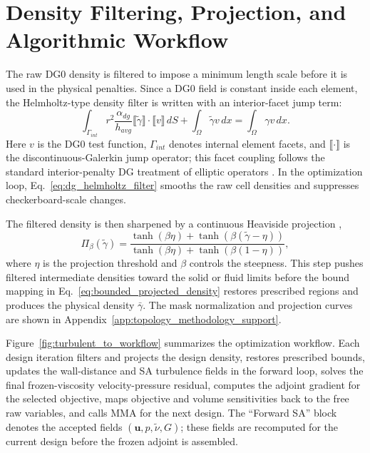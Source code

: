 \section{Density Filtering, Projection, and Algorithmic Workflow}
\label{sec:algorithmic_workflow}
The raw DG0 density is filtered to impose a minimum length scale before it is used in the physical penalties. Since a DG0 field is constant inside each element, the Helmholtz-type density filter \cite{Bourdin2001,Lazarov2011} is written with an interior-facet jump term:
\begin{equation}
	\int_{\Gamma_{int}}
	r^2
	\frac{\alpha_{dg}}{h_{avg}}
	\llbracket \tilde{\gamma} \rrbracket
	\cdot
	\llbracket v \rrbracket
	\,dS
	+
	\int_{\Omega}\tilde{\gamma}v\,dx
	=
	\int_{\Omega}\gamma v\,dx .
	\label{eq:dg_helmholtz_filter}
\end{equation}
Here $v$ is the DG0 test function, $\Gamma_{int}$ denotes internal element facets, and $\llbracket\cdot\rrbracket$ is the discontinuous-Galerkin jump operator; this facet coupling follows the standard interior-penalty DG treatment of elliptic operators \cite{Arnold2002}. In the optimization loop, Eq.~\ref{eq:dg_helmholtz_filter} smooths the raw cell densities and suppresses checkerboard-scale changes.

The filtered density is then sharpened by a continuous Heaviside projection \cite{Guest2004,Wang2011},
\begin{equation}
	\Pi_\beta(\tilde{\gamma}) =
	\frac{\tanh(\beta \eta)+\tanh(\beta(\tilde{\gamma}-\eta))}
	{\tanh(\beta \eta)+\tanh(\beta(1-\eta))},
	\label{eq:tanh_projection}
\end{equation}
where $\eta$ is the projection threshold and $\beta$ controls the steepness. This step pushes filtered intermediate densities toward the solid or fluid limits before the bound mapping in Eq.~\ref{eq:bounded_projected_density} restores prescribed regions and produces the physical density $\bar{\gamma}$. The mask normalization and projection curves are shown in Appendix~\ref{app:topology_methodology_support}.

Figure~\ref{fig:turbulent_to_workflow} summarizes the optimization workflow. Each design iteration filters and projects the design density, restores prescribed bounds, updates the wall-distance and SA turbulence fields in the forward loop, solves the final frozen-viscosity velocity-pressure residual, computes the adjoint gradient for the selected objective, maps objective and volume sensitivities back to the free raw variables, and calls MMA for the next design. The ``Forward SA'' block denotes the accepted fields $(\mathbf{u},p,\tilde{\nu},G)$; these fields are recomputed for the current design before the frozen adjoint is assembled.


